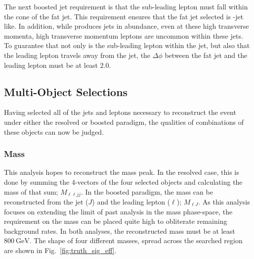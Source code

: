 The next boosted jet requirement is that the sub-leading lepton must fall within the cone of the fat jet. This requirement ensures that the fat jet selected is \NR-jet like. In addition, while \CMS produces jets in abundance, even at these high transverse momenta, high transverse momentum leptons are uncommon within these jets. To guarantee that not only is the sub-leading lepton within the jet, but also that the leading lepton travels away from the \NR jet, the $\Delta\phi$ between the fat jet and the leading lepton must be at least $2.0$.

\subsection{Multi-Object Selections}

Having selected all of the jets and leptons necessary to reconstruct the event under either the resolved or boosted paradigm, the qualities of combinations of these objects can now be judged. 
\subsubsection{\WR Mass}
This analysis hopes to reconstruct the \WR mass peak. In the resolved case, this is done by summing the 4-vectors of the four selected objects and calculating the mass of that sum; $M_{\ell\ell jj}$. In the boosted paradigm, the \WR mass can be reconstructed from the \NR jet ($J$) and the leading lepton ($\ell$); $M_{\ell J}$. 
As this analysis focuses on extending the limit of past analysis in the \WRNR mass phase-space, the requirement on the \WR mass can be placed quite high to obliterate remaining background rates. In both analyses, the reconstructed \WR mass must be at least $\SI{800}{\GeV}$.
The shape of four different \WR masses, spread across the searched region are shown in Fig.~\ref{fig:truth_sig_eff}.

